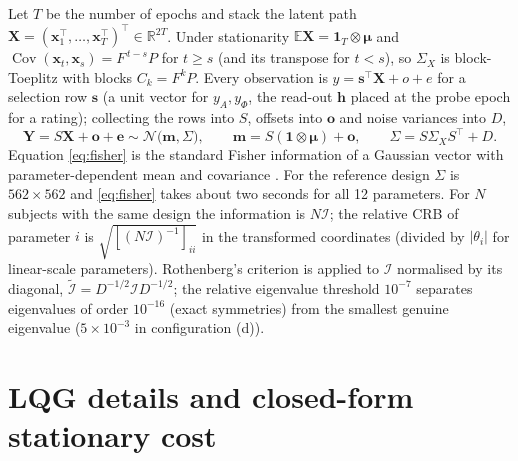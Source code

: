 \documentclass[12pt,a4paper]{article}
\theoremstyle{plain}
\theoremstyle{definition}
\theoremstyle{remark}
\newcommand{\E}{\mathbb{E}}
\newcommand{\R}{\mathbb{R}}
\newcommand{\One}{\mathbf{1}}
\newcommand{\Cov}{\operatorname{Cov}}
\newcommand{\muv}{\boldsymbol{\mu}}
\newcommand{\xv}{\mathbf{x}}
\newcommand{\hv}{\mathbf{h}}
\begin{document}
Let $T$ be the number of epochs and stack the latent path $\mathbf X=(\xv_1^\top,\dots,\xv_T^\top)^\top\in\R^{2T}$. Under stationarity $\E\mathbf X=\One_T\otimes\muv$ and $\Cov(\xv_t,\xv_s)=F^{\,t-s}P$ for $t\ge s$ (and its transpose for $t<s$), so $\Sigma_X$ is block-Toeplitz with blocks $C_k=F^kP$. Every observation is $y=\mathbf s^\top\mathbf X+o+e$ for a selection row $\mathbf s$ (a unit vector for $y_A,y_\Phi$, the read-out $\hv$ placed at the probe epoch for a rating); collecting the rows into $S$, offsets into $\mathbf o$ and noise variances into $D$,
\[
\mathbf Y=S\mathbf X+\mathbf o+\mathbf e\sim\mathcal N\bigl(\mathbf m,\Sigma\bigr),\qquad
\mathbf m=S(\One\otimes\muv)+\mathbf o,\qquad \Sigma=S\Sigma_XS^\top+D .
\]
Equation \eqref{eq:fisher} is the standard Fisher information of a Gaussian vector with parameter-dependent mean and covariance \citep{Ljung1999}. For the reference design $\Sigma$ is $562\times562$ and \eqref{eq:fisher} takes about two seconds for all 12 parameters. For $N$ subjects with the same design the information is $N\mathcal I$; the relative CRB of parameter $i$ is $\sqrt{[(N\mathcal I)^{-1}]_{ii}}$ in the transformed coordinates (divided by $|\theta_i|$ for linear-scale parameters). Rothenberg's criterion is applied to $\mathcal I$ normalised by its diagonal, $\tilde{\mathcal I}=D^{-1/2}\mathcal ID^{-1/2}$; the relative eigenvalue threshold $10^{-7}$ separates eigenvalues of order $10^{-16}$ (exact symmetries) from the smallest genuine eigenvalue ($5\times10^{-3}$ in configuration (d)).

\section{LQG details and closed-form stationary cost}
\label{app:lqg}
\end{document}
